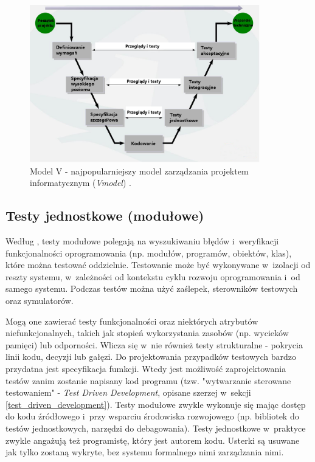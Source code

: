 \begin{figure}[!htb]
    \centering
    \includegraphics[width=10cm]{imgs/ch2_model_v_pl.jpg}
    \caption{Model V - najpopularniejszy model zarządzania projektem informatycznym (\textit{V\-model}) \cite{website:android:modelv}.}
    \label{fig:model_v}
\end{figure} 

\subsection{Testy jednostkowe (modułowe)}

Według \cite{bib:sylabus:foundation}, testy modułowe polegają na wyszukiwaniu błędów i~weryfikacji funkcjonalności oprogramowania (np. modułów, programów, obiektów, klas), które można testować oddzielnie. Testowanie może być wykonywane w~izolacji od reszty systemu, w~zależności od kontekstu cyklu rozwoju oprogramowania i~od samego systemu. Podczas testów można użyć zaślepek, sterowników testowych oraz symulatorów. 

Mogą one zawierać testy funkcjonalności oraz niektórych atrybutów niefunkcjonalnych, takich jak stopień wykorzystania zasobów (np. wycieków pamięci) lub odporności. Wlicza się w~nie również testy strukturalne - pokrycia linii kodu, decyzji lub gałęzi. Do projektowania przypadków testowych bardzo przydatna jest specyfikacja fumkcji. Wtedy jest możliwość zaprojektowania testów zanim zostanie napisany kod programu (tzw. "wytwarzanie sterowane testowaniem" - \textit{Test Driven Development}, opisane szerzej w~sekcji \ref{test_driven_development}). Testy modułowe zwykle wykonuje się mając dostęp do kodu źródłowego i~przy wsparciu środowiska rozwojowego (np. bibliotek do testów jednostkowych, narzędzi do debagowania). Testy jednostkowe w~praktyce zwykle angażują też programistę, który jest autorem kodu. Usterki są usuwane jak tylko zostaną wykryte, bez systemu formalnego nimi zarządzania nimi.

